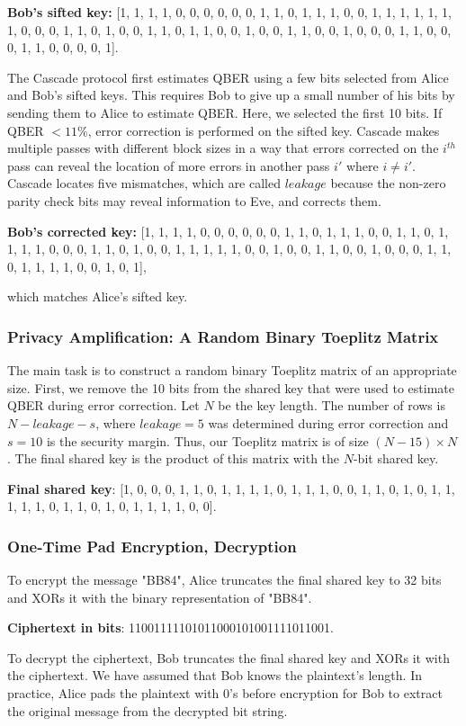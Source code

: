 \textbf{Bob's sifted key:}  [1, 1, 1, 1, 0, 0, 0, 0, 0, 0, 1, 1, 0, 1, 1, 1, 0, 0, 1, 1, 1, 1, 1, 1, 1, 0, 0, 0, 1, 1, 0, 1, 0, 0, 1, 1, 0, 1, 1, 0, 0, 1, 0, 0, 1, 1, 0, 0, 1, 0, 0, 0, 1, 1, 0, 0, 0, 1, 1, 0, 0, 0, 0, 1].

The Cascade protocol first estimates QBER using a few bits selected from Alice and Bob's sifted keys. This requires Bob to give up a small number of his bits by sending them to Alice to estimate QBER. 
Here, we selected the first 10 bits. If QBER $< 11\%$, error correction is performed on the sifted key.
Cascade makes multiple passes with different block sizes in a way that errors corrected on the $i^{th}$ pass can reveal the location of more errors in another pass $i'$ where $i\ne i'$. 
Cascade locates five mismatches, which are called $leakage$ because the non-zero parity check bits may reveal information to Eve, and corrects them. 

\textbf{Bob's corrected key:} [1, 1, 1, 1, 0, 0, 0, 0, 0, 0, 1, 1, 0, 1, 1, 1, 0, 0, 1, 1, 0, 1, 1, 1, 1, 0, 0, 0, 1, 1, 0, 1, 0, 0, 1, 1, 1, 1, 1, 0, 0, 1, 0, 0, 1, 1, 0, 0, 1, 0, 0, 0, 1, 1, 0, 1, 1, 1, 1, 0, 0, 1, 0, 1],

\noindent which matches Alice's sifted key.

\subsubsection{Privacy Amplification: A Random Binary Toeplitz Matrix}

The main task is to construct a random binary Toeplitz matrix of an appropriate size. First, we remove the 10 bits from the shared key that were used to estimate QBER during error correction. 
Let $N$ be the key length. The number of rows is $N-leakage-s$, where $leakage=5$ was determined during error correction and $s=10$ is the security margin. 
Thus, our Toeplitz matrix is of size $(N-15)\times N$. The final shared key is the product of this matrix with the $N$-bit shared key.

\textbf{Final shared key}: [1, 0, 0, 0, 1, 1, 0, 1, 1, 1, 1, 0, 1, 1, 1, 0, 0, 1, 1, 0, 1, 0, 1, 1, 1, 1, 1, 0, 1, 1, 0, 1, 0, 1, 1, 1, 1, 0, 0].

\subsubsection{One-Time Pad Encryption, Decryption}

To encrypt the message "BB84", Alice truncates the final shared key to 32 bits and XORs it with the binary representation of "BB84". 

\textbf{Ciphertext in bits}: 11001111101011000101001111011001.

To decrypt the ciphertext, Bob truncates the final shared key and XORs it with the ciphertext. 
We have assumed that Bob knows the plaintext's length. In practice, Alice pads the plaintext with 0's before encryption for Bob to extract the original message from the decrypted bit string.

